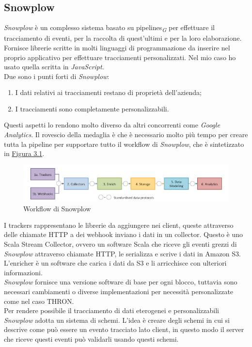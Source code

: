 \documentclass[a4paper, 12pt, twoside, openright]{book}
\newcommand{\gloss}[1]{#1\textsubscript{\textit{\tiny{G}}}}
\begin{document}
\subsection{Snowplow}
\label{snowplow}
\textit{Snowplow} è un complesso sistema basato su \gloss{pipelines} per effettuare il tracciamento di eventi, per la raccolta di quest'ultimi e per la loro elaborazione.\\
Fornisce librerie scritte in molti linguaggi di programmazione da inserire nel proprio applicativo per effettuare tracciamenti personalizzati. Nel mio caso ho usato quella scritta in \textit{JavaScript}.\\
Due sono i punti forti di \textit{Snowplow}: 
\begin{enumerate}
	\item I dati relativi ai tracciamenti restano di proprietà dell'azienda;
	\item I tracciamenti sono completamente personalizzabili.
\end{enumerate}
Questi aspetti lo rendono molto diverso da altri concorrenti come \textit{Google Analytics}. Il rovescio della medaglia è che è necessario molto più tempo per creare tutta la pipeline per supportare tutto il workflow di \textit{Snowplow}, che è sintetizzato in \hyperref[snowplow-workflow]{Figura 3.1}.
\begin{figure}[H]
	\centering
	\label{snowplow-workflow}
	\includegraphics[width=1.0\textwidth]{images/snowplow-workflow.png}
	\caption{Workflow di Snowplow}
\end{figure} 
I trackers rappresentano le librerie da aggiungere nei client, queste attraverso delle chiamate HTTP a dei webhook inviano i dati in un collector. Questo è uno Scala Stream Collector, ovvero un software Scala che riceve gli eventi grezzi di \textit{Snowplow} attraverso chiamate HTTP, le serializza e scrive i dati in Amazon S3. L'enricher è un software che carica i dati da S3 e li arricchisce con ulteriori informazioni.\\
\textit{Snowplow} fornisce una versione software di base per ogni blocco, tuttavia sono necessari cambiamenti o diverse implementazioni per necessità personalizzate come nel caso THRON.\\
Per rendere possibile il tracciamento di dati eterogenei e personalizzabili \textit{Snowplow} adotta un sistema di schemi. L'idea è creare degli schemi in cui si descrive come può essere un evento tracciato lato client, in questo modo il server che riceve questi eventi può validarli usando questi schemi.\\ 
\end{document}

